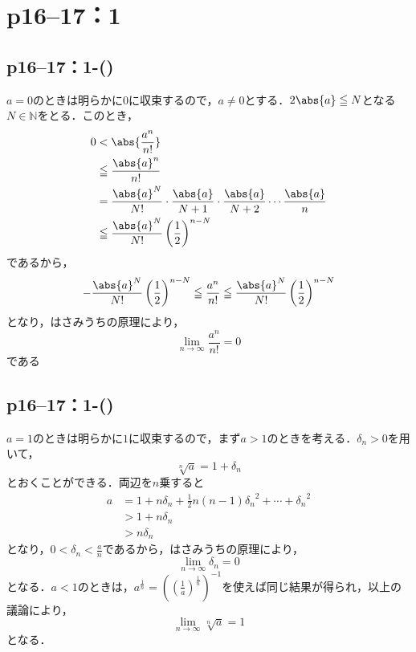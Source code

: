 \section*{p16--17：1}

\subsection*{p16--17：1-()}

\begin{tanswer}
    $a=0$のときは明らかに$0$に収束するので，$a \ne 0$とする．$2\abs{a} \le N$となる$N \in \mathbb{N}$をとる．このとき，
    \begin{align*}
        0 & < \abs{ \frac{a^n}{n!} }                                                                              \\
          & \le \frac{\abs{a}^n}{n!}                                                                              \\
          & = \frac{\abs{a}^{N}}{N!} \cdot \frac{\abs{a}}{N+1} \cdot \frac{\abs{a}}{N+2} \dotsm \frac{\abs{a}}{n} \\
          & \le  \frac{\abs{a}^{N}}{N!} \left(\frac{1}{2} \right)^{n-N}
    \end{align*}
    であるから，
    \[
        - \frac{\abs{a}^{N}}{N!} \left(\frac{1}{2} \right)^{n-N} \le  \frac{a^n}{n!} \le \frac{\abs{a}^{N}}{N!} \left(\frac{1}{2} \right)^{n-N}
    \]
    となり，はさみうちの原理により，
    \[
        \lim_{n \to \infty} \frac{a^n}{n!} =0
    \]
    である
\end{tanswer}

\subsection*{p16--17：1-()}

\begin{tanswer}
    $a=1$のときは明らかに$1$に収束するので，まず$a>1$のときを考える．$\delta_n >0$を用いて，
    \[
        \sqrt[n]{a} =1+\delta_n
    \]
    とおくことができる．両辺を$n$乗すると
    \begin{align*}
        a & = 1+ n \delta_n + \frac{1}{2}n(n-1) {\delta_n}^2 + \cdots + {\delta_n}^2 \\
          & >1+n \delta_n                                                            \\
          & >n \delta_n
    \end{align*}
    となり，$0<\delta_n <\frac{a}{n}$であるから，はさみうちの原理により，
    \[
        \lim_{n \to \infty} \delta_n =0
    \]
    となる．$a<1$のときは，$a^{\frac{1}{n}}=\left(\left(\frac{1}{a}\right)^{\frac{1}{n}}\right)^{-1}$を使えば同じ結果が得られ，以上の議論により，
    \[
        \lim_{n \to \infty} \sqrt[n]{a} =1
    \]
    となる．
\end{tanswer}

